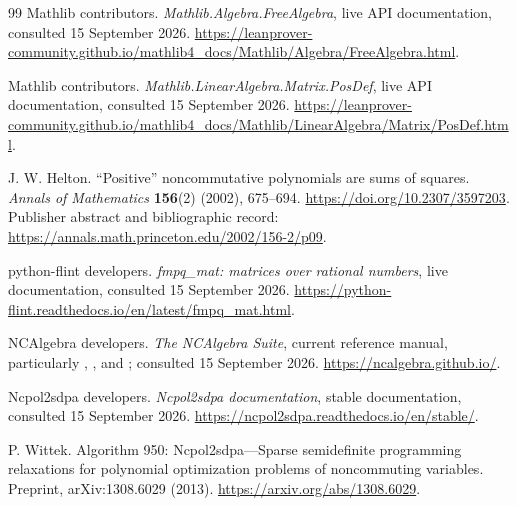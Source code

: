 \begin{thebibliography}{99}
Mathlib contributors. \emph{Mathlib.Algebra.FreeAlgebra}, live API documentation,
consulted 15 September 2026.
\url{https://leanprover-community.github.io/mathlib4_docs/Mathlib/Algebra/FreeAlgebra.html}.

Mathlib contributors. \emph{Mathlib.LinearAlgebra.Matrix.PosDef}, live API
documentation, consulted 15 September 2026.
\url{https://leanprover-community.github.io/mathlib4_docs/Mathlib/LinearAlgebra/Matrix/PosDef.html}.

J. W. Helton. ``Positive'' noncommutative polynomials are sums of squares.
\emph{Annals of Mathematics} \textbf{156}(2) (2002), 675--694.
\url{https://doi.org/10.2307/3597203}.
Publisher abstract and bibliographic record:
\url{https://annals.math.princeton.edu/2002/156-2/p09}.

python-flint developers. \emph{fmpq\_mat: matrices over rational numbers},
live documentation, consulted 15 September 2026.
\url{https://python-flint.readthedocs.io/en/latest/fmpq_mat.html}.

NCAlgebra developers. \emph{The NCAlgebra Suite}, current reference manual,
particularly , , and ;
consulted 15 September 2026.
\url{https://ncalgebra.github.io/}.

Ncpol2sdpa developers. \emph{Ncpol2sdpa documentation}, stable documentation,
consulted 15 September 2026.
\url{https://ncpol2sdpa.readthedocs.io/en/stable/}.

P. Wittek. Algorithm 950: Ncpol2sdpa---Sparse semidefinite programming relaxations
for polynomial optimization problems of noncommuting variables.
Preprint, arXiv:1308.6029 (2013).
\url{https://arxiv.org/abs/1308.6029}.
\end{thebibliography}
